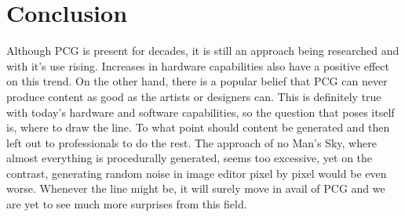 \documentclass[journal]{IEEEtran}
\begin{document}
\section{Conclusion}
Although PCG is present for decades, it is still an approach being researched and with it's use rising. Increases in hardware capabilities also have a positive effect on this trend. On the other hand, there is a popular belief that PCG can never produce content as good as the artists or designers can. This is definitely true with today's hardware and software capabilities, so the question that poses itself is, where to draw the line. To what point should content be generated and then left out to professionals to do the rest. The approach of no Man's Sky, where almost everything is procedurally generated, seems too excessive, yet on the contrast, generating random noise in image editor pixel by pixel would be even worse. Whenever the line might be, it will surely move in avail of PCG and we are yet to see much more surprises from this field.

\ifCLASSOPTIONcaptionsoff
  \newpage
\fi



\end{document}
